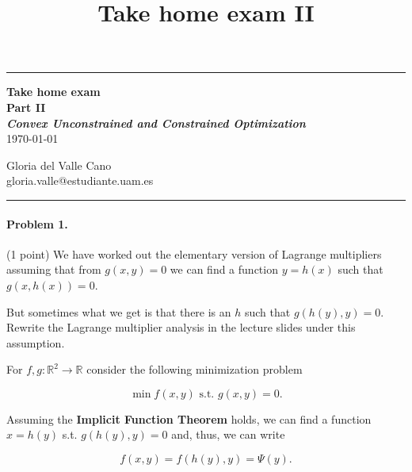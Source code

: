 \documentclass[12pt]{scrartcl}
\title{Take home exam II}
\begin{document}
\begin{center}
	\hrule
	\vspace{.4cm}
	{\textbf { \large \textbf{Take home exam} \\ Part II \\ \vspace{1em} \small \textit{Convex Unconstrained and Constrained Optimization}} \\ \vspace{0.5em}\today}
\end{center}

\begin{center}
{ \vspace{0.5em} Gloria del Valle Cano \hspace{\fill}   \\}
{ gloria.valle@estudiante.uam.es \hspace{\fill} \\ \vspace{1.5em}}
	\hrule
\end{center}



\begin{boxF}
\paragraph*{Problem 1.}(1 point) \hspace{0.15em} We have worked out the elementary version of Lagrange multipliers assuming that from $g(x, y) = 0$ we can find a function $y = h(x)$ such that $g(x, h(x)) = 0$. 

But sometimes what we get is that there is an $h$ such that $g(h(y), y) = 0$. Rewrite the Lagrange multiplier analysis in the lecture slides under this assumption.
\end{boxF}

For $f,g: \mathbb{R}^2 \to \mathbb{R}$ consider the following minimization problem

\begin{equation*}
    \min f(x, y) \mbox{ s.t. } g(x, y) = 0.
\end{equation*}

Assuming the \textbf{Implicit Function Theorem} holds, we can find a function $x = h(y)$ s.t. $g(h(y), y) = 0$ and, thus, we can write

\begin{equation*}
    f(x, y) = f(h(y), y) = \Psi(y).
\end{equation*}
\end{document}
